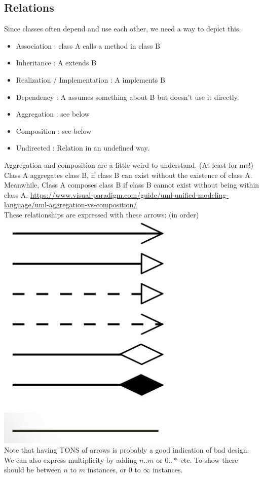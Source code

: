 \documentclass[12pt]{article}
\theoremstyle{definition}
\begin{document}
\subsection{Relations}
Since classes often depend and use each other, we need a way to depict this.
\\ \linebreak
\begin{itemize}
	\item Association : class A calls a method in class B
	\item Inheritance : A extends B
	\item Realization / Implementation : A implements B  
	\item Dependency : A assumes something about B but doesn't use it directly.
	\item Aggregation : see below
	\item Composition : see below
	\item Undirected : Relation in an undefined way.
\end{itemize}
Aggregation and composition are a little weird to understand. (At least for me!) Class A aggregates class B, if class B can exist without the existence of class A. Meanwhile, Class A composes class B if class B cannot exist without being within class A. \url{https://www.visual-paradigm.com/guide/uml-unified-modeling-language/uml-aggregation-vs-composition/}
\\ \linebreak
These relationships are expressed with these arrows: (in order)\\
\includegraphics[scale=0.5]{arrows}
\\
Note that having TONS of arrows is probably a good indication of bad design.
\\ \linebreak
We can also express multiplicity by adding $n..m$ or $0..*$ etc. To show there should be between $n$ to $m$ instances, or $0$ to $\infty$ instances.
\\ \linebreak
\end{document}
